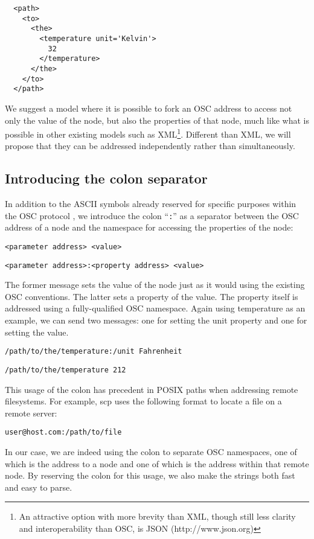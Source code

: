 \documentclass{NIME-alternate}
\begin{document}
\begin{lstlisting}
  <path>
    <to>
      <the>
        <temperature unit='Kelvin'>
          32
        </temperature>
      </the>
    </to>
  </path>
\end{lstlisting}

We suggest a model where it is possible to fork an OSC address to access not only the value of the node, but also the properties of that node, much like what is possible in other existing models such as XML\footnote{An attractive option with more brevity than XML, though still less clarity and interoperability than OSC, is JSON (http://www.json.org)}.  Different than XML, we will propose that they can be addressed independently rather than simultaneously.


\subsection{Introducing the colon separator}
\label{sub:the_colon_separator}

In addition to the ASCII symbols already reserved for specific purposes within the OSC protocol \cite{Wright:1997}, we introduce the colon ``\texttt{:}'' as a separator between the OSC address of a node and the namespace for accessing the properties of the node:

\texttt{<parameter address> <value>}

\texttt{<parameter address>:<property address> <value>}

The former message sets the value of the node just as it would using the existing OSC conventions. The latter sets a property of the value.  The property itself is addressed using a fully-qualified OSC namespace. Again using temperature as an example, we can send two messages: one for setting the unit property and one for setting the value.

\texttt{/path/to/the/temperature:/unit Fahrenheit}  %

\texttt{/path/to/the/temperature 212}

This usage of the colon has precedent in POSIX paths when addressing remote filesystems.  For example, scp uses the following format to locate a file on a remote server:

\texttt{user@host.com:/path/to/file}

In our case, we are indeed using the colon to separate OSC namespaces, one of which is the address to a node and one of which is the address within that remote node.  By reserving the colon for this usage, we also make the strings both fast and easy to parse.
\end{document}
